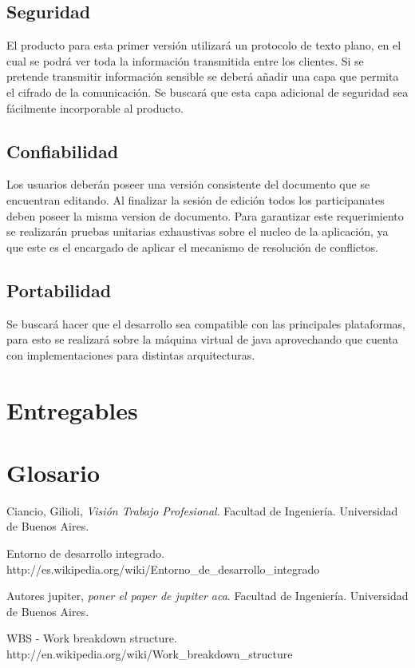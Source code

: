 \documentclass[12pt,a4paper]{article}
\begin{document}
\subsection{Seguridad} El producto para esta primer versión utilizará un protocolo de texto plano, en el cual se podrá ver toda la información transmitida entre los clientes. Si se pretende transmitir información sensible se deberá añadir una capa que permita el cifrado de la comunicación. Se buscará que esta capa adicional de seguridad sea fácilmente incorporable al producto.

\subsection{Confiabilidad} Los usuarios deberán poseer una versión consistente del documento que se encuentran editando. Al finalizar la sesión de edición todos los participanates deben poseer la misma version de documento. Para garantizar este requerimiento se realizarán pruebas unitarias exhaustivas sobre el nucleo de la aplicación, ya que este es el encargado de aplicar el mecanismo de resolución de conflictos.

\subsection{Portabilidad} Se buscará hacer que el desarrollo sea compatible con las principales plataformas, para esto se realizará sobre la máquina virtual de java aprovechando que cuenta con implementaciones para distintas arquitecturas.	
	
	\section{Entregables}
	\section{Glosario}

\newpage
\begin{thebibliography}{9}
	Ciancio, Gilioli,
	\emph{Visión Trabajo Profesional}.
	Facultad de Ingeniería.
	Universidad de Buenos Aires. 

	Entorno de desarrollo integrado. \\
	http://es.wikipedia.org/wiki/Entorno\_de\_desarrollo\_integrado

	Autores jupiter,
	\emph{poner el paper de jupiter aca}.
	Facultad de Ingeniería.
	Universidad de Buenos Aires.

	WBS - Work breakdown structure. \\
	http://en.wikipedia.org/wiki/Work\_breakdown\_structure

\end{thebibliography}
\end{document}
